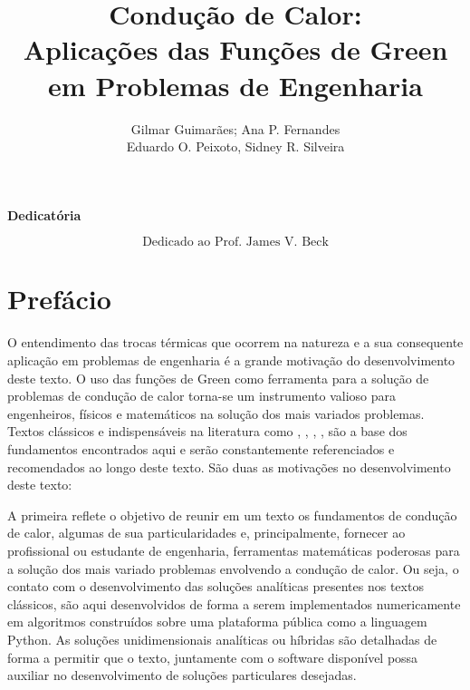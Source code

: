 \documentclass[a4paper,12pt,fleqn,twoside]{book}
\newenvironment{dedication}{\bgroup\par\noindent\textbf{Dedicatória}\par%
	\[}{\]\egroup}
\begin{document}
	
	\thispagestyle{empty}
	\title{\Huge \textbf{Condução de Calor:}  \\ \huge Aplicações das Funções de Green em Problemas de Engenharia}
	\author{Gilmar Guimarães; Ana P. Fernandes \\ Eduardo O. Peixoto, Sidney R. Silveira}
	\maketitle
	
	\thispagestyle{empty}
	\begin{dedication}
		\text{Dedicado ao Prof. James V. Beck}
	\end{dedication}
	
	\thispagestyle{empty}
	\tableofcontents
	\thispagestyle{empty}
	\listoffigures
	
	\thispagestyle{empty}
	\chapter*{Prefácio}

	O entendimento das trocas térmicas que ocorrem na natureza e a sua consequente aplicação em problemas de engenharia é a grande motivação do desenvolvimento deste texto. O uso das funções de Green como ferramenta para a solução de problemas  de condução de calor torna-se um instrumento valioso para engenheiros, físicos e matemáticos na solução dos mais variados problemas. Textos clássicos e indispensáveis na literatura como \textcite{carslaw1959}, \textcite{arpaci1966}, \textcite{ozisik1993}, \textcite{beck2010}, \textcite{beck1985} são a base dos fundamentos encontrados aqui e serão constantemente referenciados e recomendados ao longo deste texto. São duas as motivações no desenvolvimento deste texto:
		
	A primeira reflete o objetivo de reunir em um texto os fundamentos de condução de calor, algumas de sua particularidades e, principalmente, fornecer ao profissional ou estudante de engenharia, ferramentas matemáticas poderosas para a solução dos mais variado problemas envolvendo a condução de calor. Ou seja, o contato com o desenvolvimento das soluções analíticas presentes nos textos clássicos, são aqui desenvolvidos de forma a serem implementados numericamente em algoritmos construídos sobre uma plataforma pública como a linguagem Python. As soluções unidimensionais analíticas ou híbridas são detalhadas de forma a permitir que o texto, juntamente com o software disponível possa auxiliar no desenvolvimento de soluções particulares desejadas.
		
\end{document}
